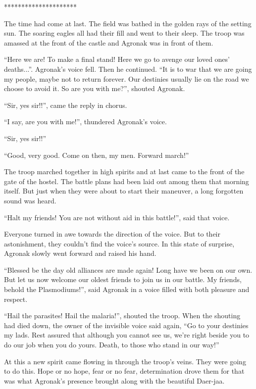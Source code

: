 \documentclass[twoside,11pt,titlepage]{article}
\begin{document}
\bigskip
\begin{center}
*********************
\end{center}

The time had come at last. The field was bathed in the golden rays of the setting sun. The soaring eagles all had their fill and went to their sleep. The troop was amassed at the front of the castle and Agronak was in front of them.

``Here we are! To make a final stand! Here we go to avenge our loved ones' deaths...''. Agronak's voice fell. Then he continued. ``It is to war that we are going my people, maybe not to return forever. Our destinies usually lie on the road we choose to avoid it. So are you with me?'', shouted Agronak.

``Sir, yes sir!!'', came the reply in chorus.

``I say, are you with me!'', thundered Agronak's voice.

``Sir, yes sir!!''

``Good, very good. Come on then, my men. Forward march!''

The troop marched together in high spirits and at last came to the front of the gate of the hostel. The battle plans had been laid out among them that morning itself. But just when they were about to start their maneuver, a long forgotten sound was heard.

``Halt my friends! You are not without aid in this battle!'', said that voice.

Everyone turned in awe towards the direction of the voice. But to their astonishment, they couldn't find the voice's source. In this state of surprise, Agronak slowly went forward and raised his hand.

``Blessed be the day old alliances are made again! Long have we been on our own. But let us now welcome our oldest friends to join us in our battle. My friends, behold the Plasmodiums!'', said Agronak in a voice filled with both pleasure and respect.

``Hail the parasites! Hail the malaria!'', shouted the troop. When the shouting had died down, the owner of the invisible voice said again, ``Go to your destinies my lads. Rest assured that although you cannot see us, we're right beside you to do our job when you do yours. Death, to those who stand in our way!''

At this a new spirit came flowing in through the troop's veins. They were going to do this. Hope or no hope, fear or no fear, determination drove them for that was what Agronak's presence brought along with the beautiful Daer-jaa.
\end{document}
